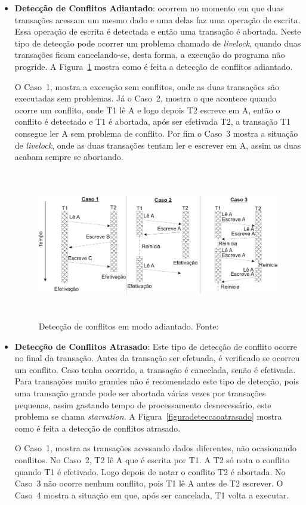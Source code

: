 \documentclass[diss,capa]{texufpel}
\begin{document}
\begin{itemize}
 \item \textbf{Detecção de Conflitos Adiantado}: ocorrem no momento em que duas transações acessam um mesmo dado e uma delas faz uma operação de escrita. Essa operação de escrita é detectada e então uma transação é abortada. Neste tipo de detecção pode ocorrer um problema chamado de \emph{livelock}, quando duas transações ficam cancelando-se, desta forma, a execução do programa não progride. A Figura~\ref{figuradeteccaoadiantado} mostra como é feita a detecção de conflitos adiantado.

 O Caso~1, mostra a execução sem conflitos, onde as duas transações são executadas sem problemas. Já o Caso~2, mostra o que acontece quando ocorre um conflito, onde T1 lê A e logo depois T2 escreve em A, então o conflito é detectado e T1 é abortada, após ser efetivada T2, a transação T1 consegue ler A sem problema de conflito. Por fim o Caso~3 mostra a situação de \emph{livelock}, onde as duas transações tentam ler e escrever em A, assim as duas acabam sempre se abortando.

\begin{figure}[!htp]
\centering
\includegraphics[height=6.5cm]{images/conflitoadiantado.png}
\caption{Detecção de conflitos em modo adiantado. Fonte:~\cite{rigotm}}
\label{figuradeteccaoadiantado}
\end{figure}


 \item \textbf{Detecção de Conflitos Atrasado}: Este tipo de detecção de conflito ocorre no final da transação.  Antes da transação ser efetuada, é verificado se ocorreu um conflito. Caso tenha ocorrido, a transação é cancelada, senão é efetivada. Para transações muito grandes não é recomendado este tipo de detecção, pois uma transação grande pode ser abortada várias vezes por transações pequenas, assim gastando tempo de processamento desnecessário, este problema se chama \emph{starvation}. A Figura~\ref{figuradeteccaoatrasado} mostra como é feita a detecção de conflitos atrasado.

 O Caso~1, mostra as transações acessando dados diferentes, não ocasionando conflitos. No Caso~2, T2 lê A que é escrita por T1. A T2 só nota o conflito quando T1 é efetivado. Logo depois de notar o conflito T2 é abortada. No Caso~3 não ocorre nenhum conflito, pois T1 lê A antes de T2 escrever. O Caso~4 mostra a situação em que, após ser cancelada, T1 volta a executar.
\end{itemize}
\end{document}
